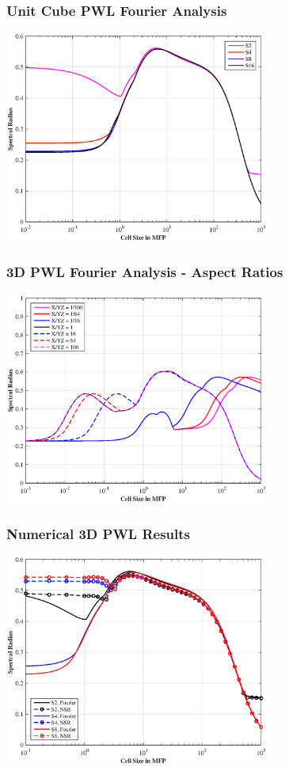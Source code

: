 \documentclass[compress,10pt]{beamer}
\begin{document}
\begin{frame}[t]
{
\frametitle{Unit Cube PWL Fourier Analysis}
\vspace{6mm}
\centering
\includegraphics[width=0.65\textwidth]{images/SI_MIP_hex_C=4_PWLD_LS.eps}
}
{
\frametitle{3D PWL Fourier Analysis - Aspect Ratios}
\vspace{6mm}
\centering
\includegraphics[width=0.65\textwidth]{images/SI_MIP_hex_PWLD1_AR4.eps}
}
{
\frametitle{Numerical 3D PWL Results}
\vspace{6mm}
\centering
\includegraphics[width=0.65\textwidth]{images/SI_MIP_hex_C=4_PWLD_LS_wNSR.eps}
}
\end{frame}
\end{document}
